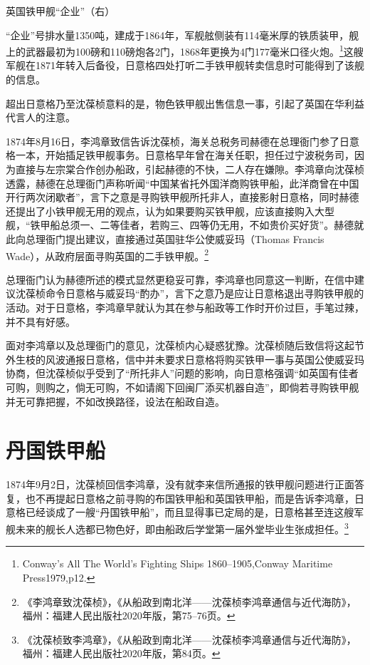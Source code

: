 \documentclass[12pt,UTF8]{ctexbook}
\begin{document}
英国铁甲舰“企业”（右）

“企业”号排水量1350吨，建成于1864年，军舰舷侧装有114毫米厚的铁质装甲，舰上的武器最初为100磅和110磅炮各2门，1868年更换为4门177毫米口径火炮。\footnote{Conway's All The World's Fighting Ships 1860--1905,Conway Maritime Press1979,p12.}这艘军舰在1871年转入后备役，日意格四处打听二手铁甲舰转卖信息时可能得到了该舰的信息。

超出日意格乃至沈葆桢意料的是，物色铁甲舰出售信息一事，引起了英国在华利益代言人的注意。

1874年8月16日，李鸿章致信告诉沈葆桢，海关总税务司赫德在总理衙门参了日意格一本，开始插足铁甲舰事务。日意格早年曾在海关任职，担任过宁波税务司，因为直接与左宗棠合作创办船政，引起赫德的不快，二人存在嫌隙。李鸿章向沈葆桢透露，赫德在总理衙门声称听闻“中国某省托外国洋商购铁甲船，此洋商曾在中国开行两次闭歇者”，言下之意是寻购铁甲舰所托非人，直接影射日意格，同时赫德还提出了小铁甲舰无用的观点，认为如果要购买铁甲舰，应该直接购入大型舰，“铁甲船总须一、二等佳者，若购三、四等仍无用，不如贵价买好货”。赫德就此向总理衙门提出建议，直接通过英国驻华公使威妥玛（Thomas Francis Wade），从政府层面寻购英国的二手铁甲舰。\footnote{《李鸿章致沈葆桢》，《从船政到南北洋——沈葆桢李鸿章通信与近代海防》，福州：福建人民出版社2020年版，第75--76页。}

总理衙门认为赫德所述的模式显然更稳妥可靠，李鸿章也同意这一判断，在信中建议沈葆桢命令日意格与威妥玛“酌办”，言下之意乃是应让日意格退出寻购铁甲舰的活动。对于日意格，李鸿章早就认为其在参与船政等工作时开价过巨，手笔过辣，并不具有好感。

面对李鸿章以及总理衙门的意见，沈葆桢内心疑惑犹豫。沈葆桢随后致信将这起节外生枝的风波通报日意格，信中并未要求日意格将购买铁甲一事与英国公使威妥玛协商，但沈葆桢似乎受到了“所托非人”问题的影响，向日意格强调“如英国有佳者可购，则购之，倘无可购，不如请阁下回闽厂添买机器自造”，即倘若寻购铁甲舰并无可靠把握，不如改换路径，设法在船政自造。

\section{丹国铁甲船}

1874年9月2日，沈葆桢回信李鸿章，没有就李来信所通报的铁甲舰问题进行正面答复，也不再提起日意格之前寻购的布国铁甲船和英国铁甲船，而是告诉李鸿章，日意格已经谈成了一艘“丹国铁甲船”，而且显得事已定局的是，日意格甚至连这艘军舰未来的舰长人选都已物色好，即由船政后学堂第一届外堂毕业生张成担任。\footnote{《沈葆桢致李鸿章》，《从船政到南北洋——沈葆桢李鸿章通信与近代海防》，福州：福建人民出版社2020年版，第84页。}
\end{document}
